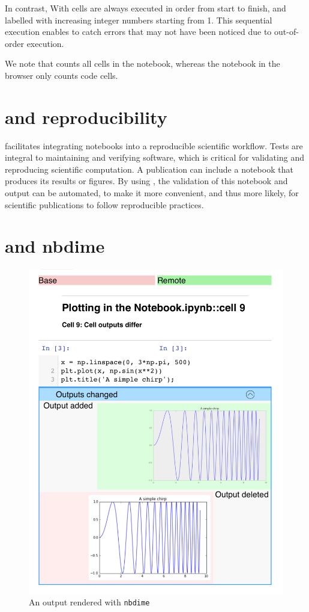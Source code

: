 \documentclass{deliverablereport}
\begin{document}
In contrast, With \nbval cells are always executed in order from start
to finish, and labelled with increasing integer numbers starting from
1.  This sequential execution enables \nbval to catch errors that may
not have been noticed due to out-of-order execution.

We note that \nbval counts all cells in the notebook, whereas the
notebook in the browser only counts code cells.


\section{\nbval and reproducibility} %

\nbval facilitates integrating notebooks into a reproducible
scientific workflow.  Tests are integral to maintaining and verifying
software, which is critical for validating and reproducing scientific
computation.  A publication can include a notebook that produces its
results or figures.  By using \nbval, the validation of this notebook
and output can be automated, to make it more convenient, and thus more
likely, for scientific publications to follow reproducible practices.


\section{\nbval and nbdime} %
\label{sec:nbval-nbdime}

\begin{figure}[ht]
  \centering
  \includegraphics[width=.7\textwidth]{img/nbval-nbdime}
  \caption{An \nbval output rendered with \texttt{nbdime}}\label{fig:nbval-nbdime}
\end{figure}
\end{document}
